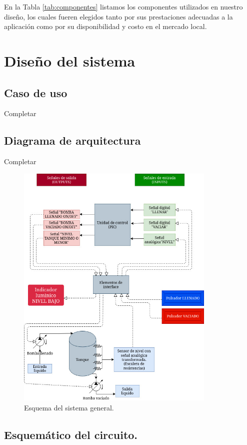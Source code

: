 \documentclass[a4paper]{article}
\begin{document}
En la Tabla \ref{tab:componentes} listamos los componentes 
utilizados en nuestro diseño, los cuales fueren elegidos tanto 
por sus prestaciones adecuadas a la aplicación como por su 
disponibilidad y costo en el mercado local.

\section{Diseño del sistema}

\subsection{Caso de uso}

Completar

\subsection{Diagrama de arquitectura}

Completar

\begin{figure}[h]\centering
    \includegraphics[height=12cm]{diagrama_sistema.jpg}
    \caption{Esquema del sistema general.}\label{fig:esquematico1}
\end{figure}
\clearpage

\subsection{Esquemático del circuito.}
\end{document}
